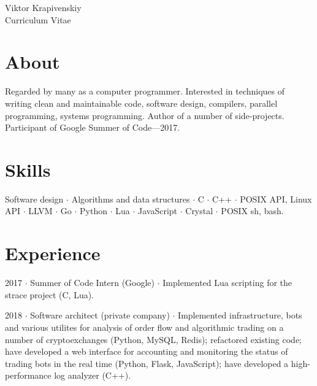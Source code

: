 \documentclass[10pt]{article}
\begin{document}
\parbox[top][0.12\textheight][c]{\linewidth}{
    \vspace{-0.04\textheight}
    \centering
    {\sffamily\Huge Viktor Krapivenskiy}\\\medskip
    {\Huge Curriculum Vitae}
}

\medskip

\section{About}

Regarded by many as a computer programmer.
Interested in
  techniques of writing clean and maintainable code,
  software design,
  compilers,
  parallel programming,
  systems programming.
Author of a number of side-projects.
Participant of Google Summer of Code---2017.

\medskip

\section{Skills}

Software design $\cdot$
Algorithms and data structures $\cdot$
C $\cdot$
C++ $\cdot$
POSIX API, Linux API $\cdot$
LLVM $\cdot$
Go $\cdot$
Python $\cdot$
Lua $\cdot$
JavaScript $\cdot$
Crystal $\cdot$
POSIX sh, bash.

\medskip

%
%

\section{Experience}

2017 $\cdot$ Summer of Code Intern (Google) $\cdot$ Implemented Lua scripting for the strace project (C, Lua).

\medskip

2018 $\cdot$ Software architect (private company) $\cdot$ Implemented infrastructure, bots and various utilites for analysis of order flow and algorithmic trading on a number of cryptoexchanges (Python, MySQL, Redis);
refactored existing code;
have developed a web interface for accounting and monitoring the status of trading bots in the real time (Python, Flask, JavaScript);
have developed a high-performance log analyzer (C++).
\end{document}
